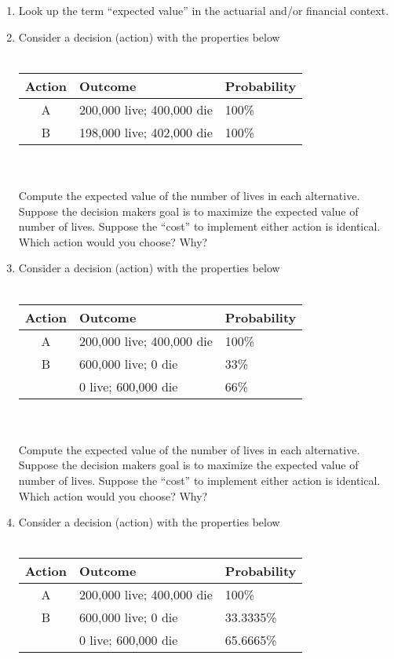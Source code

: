 \documentclass[12pt]{article}
\begin{document}
\begin{enumerate}
\item Look up the term ``expected value'' in the actuarial and/or financial context.
\item Consider a decision (action) with the properties below \\ ~\\
\begin{tabular}{cll}
Action & Outcome & Probability \\
\hline
\hline
A & 200,000 live; 400,000 die & 100\% \\
B & 198,000 live; 402,000 die & 100\% \\
\end{tabular}\\~\\
Compute the expected value of the number of lives in each alternative.
Suppose the decision makers goal is to maximize the expected value of number of lives.
Suppose the ``cost'' to implement either action is identical.
Which action would you choose? Why?
\item Consider a decision (action) with the properties below \\ ~\\
\begin{tabular}{cll}
Action & Outcome & Probability \\
\hline
\hline
A & 200,000 live; 400,000 die & 100\% \\
B & 600,000 live; 0 die & 33\% \\
~ & 0 live; 600,000 die & 66\% \\
\end{tabular}\\~\\
Compute the expected value of the number of lives in each alternative.
Suppose the decision makers goal is to maximize the expected value of number of lives.
Suppose the ``cost'' to implement either action is identical.
Which action would you choose? Why?
\item Consider a decision (action) with the properties below \\ ~\\
\begin{tabular}{cll}
Action & Outcome & Probability \\
\hline
\hline
A & 200,000 live; 400,000 die & 100\% \\
B & 600,000 live; 0 die & 33.3335\% \\
~ & 0 live; 600,000 die & 65.6665\% \\

\end{tabular}
\end{enumerate}
\end{document}
